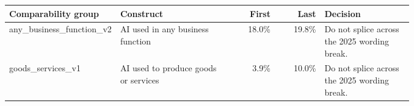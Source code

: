 \begin{tabular}{p{0.27\linewidth}p{0.28\linewidth}rrp{0.22\linewidth}}
\toprule
Comparability group & Construct & First & Last & Decision \\
\midrule
any\_business\_function\_v2 & AI used in any business function & 18.0\% & 19.8\% & Do not splice across the 2025 wording break. \\
goods\_services\_v1 & AI used to produce goods or services & 3.9\% & 10.0\% & Do not splice across the 2025 wording break. \\
\bottomrule
\end{tabular}
